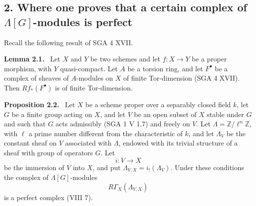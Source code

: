 \documentclass[11pt]{article}
\newenvironment{statement}[1]{\par\medskip\noindent\textbf{#1.}\ }{\par\medskip}
\begin{document}
\subsection*{2. Where one proves that a certain complex of $\Lambda[G]$-modules is perfect}

Recall the following result of SGA 4 XVII.

\begin{statement}{Lemma 2.1}
Let $X$ and $Y$ be two schemes and let $f:X\to Y$ be a proper morphism, with $Y$ quasi-compact. Let $A$ be a torsion ring, and let $F^\bullet$ be a complex of sheaves of $A$-modules on $X$ of finite Tor-dimension (SGA 4 XVII). Then $Rf_*(F^\bullet)$ is of finite Tor-dimension.
\end{statement}

\begin{statement}{Proposition 2.2}
Let $X$ be a scheme proper over a separably closed field $k$, let $G$ be a finite group acting on $X$, and let $V$ be an open subset of $X$ stable under $G$ and such that $G$ acts admissibly (SGA 1 V 1.7) and freely on $V$. Let $\Lambda=\mathbb Z/\ell^n\mathbb Z$, with $\ell$ a prime number different from the characteristic of $k$, and let $\Lambda_V$ be the constant sheaf on $V$ associated with $\Lambda$, endowed with its trivial structure of a sheaf with group of operators $G$. Let
\[
i:V\longrightarrow X
\]
be the immersion of $V$ into $X$, and put $\Lambda_{V,X}=i_!(\Lambda_V)$. Under these conditions the complex of $\Lambda[G]$-modules
\[
R\Gamma_X(\Lambda_{V,X})
\]
is a perfect complex (VIII 7).
\end{statement}
\end{document}
